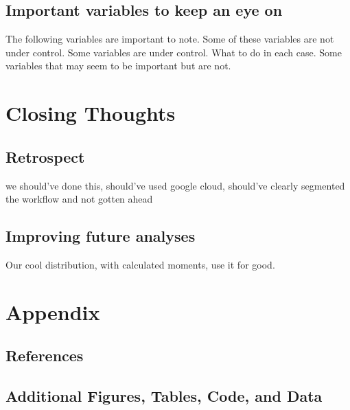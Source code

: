 \documentclass[12pt, a4paper]{book}
\newcommand\tab[1][1cm]{\hspace*{#1}}
\begin{document}
	\section{Important variables to keep an eye on}
	\tab The following variables are important to note. Some of these variables are not under control. Some variables are under control. What to do in each case. Some variables that may seem to be important but are not.
\chapter{Closing Thoughts}
	\section{Retrospect}
	\tab we should've done this, should've used google cloud, should've clearly segmented the workflow and not gotten ahead
	\section{Improving future analyses}
	\tab Our cool distribution, with calculated moments, use it for good. 
\chapter{Appendix}
	\section{References}
	\section{Additional Figures, Tables, Code, and Data}
\pagebreak


\nocite{*}

\end{document}
